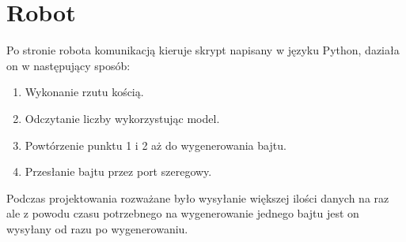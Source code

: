 \section{Robot}\label{sec:robot}
    Po stronie robota komunikacją kieruje skrypt napisany w języku Python, daziała on w następujący sposób:
    \begin{enumerate}
        \item Wykonanie rzutu kością.
        \item Odczytanie liczby wykorzystując model.
        \item Powtórzenie punktu 1 i 2 aż do wygenerowania bajtu.
        \item Przesłanie bajtu przez port szeregowy.
    \end{enumerate}

    Podczas projektowania rozważane było wysyłanie większej ilości danych na raz 
    ale z powodu czasu potrzebnego na wygenerowanie jednego bajtu jest on wysyłany od razu po wygenerowaniu.